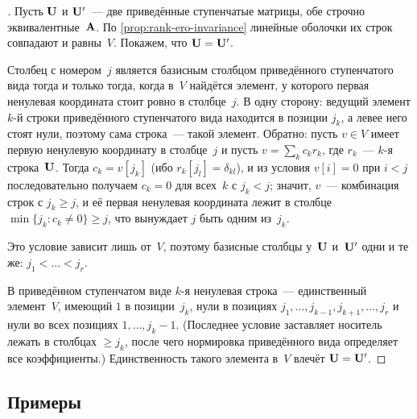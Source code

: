 \begin{proof}[]
Пусть $\mathbf{U}$ и $\mathbf{U}'$~--- две приведённые ступенчатые матрицы,
обе строчно эквивалентные~$\mathbf{A}$. По
\cref{prop:rank-ero-invariance} линейные оболочки их строк совпадают
и равны~$V$. Покажем, что $\mathbf{U} = \mathbf{U}'$.

Столбец с номером~$j$ является базисным столбцом приведённого
ступенчатого вида тогда и только тогда, когда в~$V$ найдётся элемент,
у которого первая ненулевая координата стоит ровно в столбце~$j$.
В одну сторону: ведущий элемент $k$-й строки приведённого ступенчатого
вида находится в позиции $j_k$, а левее него стоят нули, поэтому сама
строка~--- такой элемент. Обратно: пусть $v \in V$ имеет первую
ненулевую координату в столбце~$j$ и пусть $v = \sum_k c_k r_k$, где
$r_k$~--- $k$-я строка~$\mathbf{U}$. Тогда $c_k = v[j_k]$ (ибо $r_k[j_l] =
\delta_{kl}$), и из условия $v[i] = 0$ при $i < j$ последовательно
получаем $c_k = 0$ для всех~$k$ с $j_k < j$; значит, $v$~--- комбинация
строк с $j_k \ge j$, и её первая ненулевая координата лежит в столбце
$\min\{j_k : c_k \neq 0\} \ge j$, что вынуждает $j$ быть одним из~$j_k$.

Это условие зависит лишь от~$V$, поэтому базисные столбцы у~$\mathbf{U}$
и~$\mathbf{U}'$ одни и те же: $j_1 < \dots < j_r$.

В приведённом ступенчатом виде $k$-я ненулевая строка~--- единственный
элемент~$V$, имеющий $1$ в позиции~$j_k$, нули в позициях
$j_1, \dots, j_{k-1}, j_{k+1}, \dots, j_r$ и нули во всех позициях
$1, \dots, j_k - 1$. (Последнее условие заставляет носитель лежать в
столбцах $\ge j_k$, после чего нормировка приведённого вида
определяет все коэффициенты.) Единственность такого элемента в~$V$
влечёт $\mathbf{U} = \mathbf{U}'$.
\end{proof}

\subsection*{Примеры}

